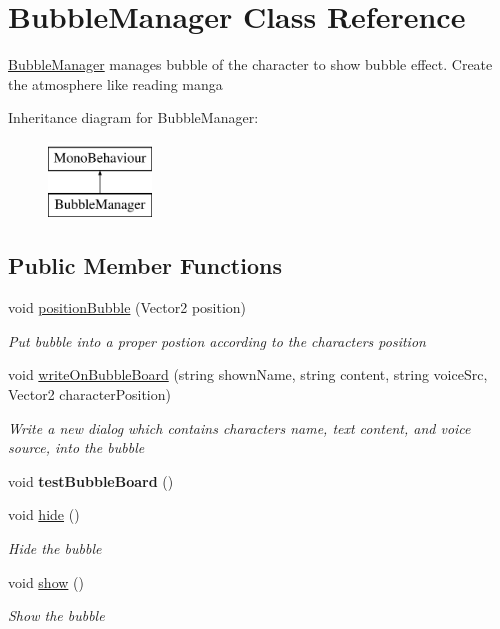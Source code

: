 \hypertarget{class_bubble_manager}{}\section{Bubble\+Manager Class Reference}
\label{class_bubble_manager}


\hyperlink{class_bubble_manager}{Bubble\+Manager} manages bubble of the character to show bubble effect. Create the atmosphere like reading manga  


Inheritance diagram for Bubble\+Manager\+:\begin{figure}[H]
\begin{center}
\leavevmode
\includegraphics[height=2.000000cm]{class_bubble_manager}
\end{center}
\end{figure}
\subsection*{Public Member Functions}
\begin{DoxyCompactItemize}
\item 
void \hyperlink{class_bubble_manager_af9acea2ad3e43b4b6a2678f0d1923c55}{position\+Bubble} (Vector2 position)
\begin{DoxyCompactList}\small\item\em Put bubble into a proper postion according to the character\textquotesingle{}s position \end{DoxyCompactList}\item 
void \hyperlink{class_bubble_manager_a11a6a2b1085ffb9aa1109dfe3be2e55d}{write\+On\+Bubble\+Board} (string shown\+Name, string content, string voice\+Src, Vector2 character\+Position)
\begin{DoxyCompactList}\small\item\em Write a new dialog which contains character\textquotesingle{}s name, text content, and voice source, into the bubble \end{DoxyCompactList}\item 
void {\bfseries test\+Bubble\+Board} ()\hypertarget{class_bubble_manager_ab2f4db139391c7cebbe1f3f2488fd198}{}\label{class_bubble_manager_ab2f4db139391c7cebbe1f3f2488fd198}

\item 
void \hyperlink{class_bubble_manager_aecb219fb99fdc12f56be6a217f91f744}{hide} ()
\begin{DoxyCompactList}\small\item\em Hide the bubble \end{DoxyCompactList}\item 
void \hyperlink{class_bubble_manager_a7196e8a86d6a57b8001a1291e052b035}{show} ()
\begin{DoxyCompactList}\small\item\em Show the bubble \end{DoxyCompactList}\end{DoxyCompactItemize}
